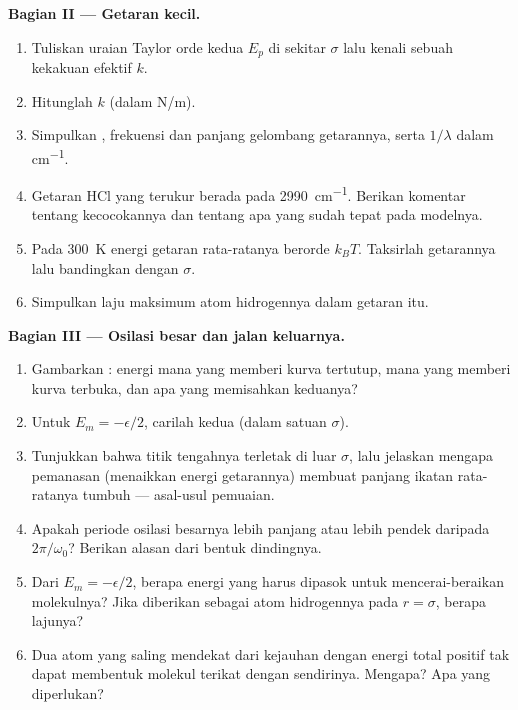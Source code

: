 \begin{problem}
\medskip
\noindent\textbf{Bagian II --- Getaran kecil.}
\begin{enumerate}[resume]
  \item Tuliskan uraian Taylor orde kedua $E_p$ di sekitar $\sigma$ lalu
        kenali sebuah kekakuan efektif $k$.
  \item Hitunglah $k$ (dalam \unit{N/m}).
  \item Simpulkan , frekuensi dan panjang gelombang
        getarannya, serta  $1/\lambda$ dalam \unit{cm^{-1}}.
  \item Getaran HCl yang terukur berada pada \qty{2990}{cm^{-1}}. Berikan
        komentar tentang kecocokannya dan tentang apa yang sudah tepat
        pada modelnya.
  \item Pada \qty{300}{K} energi getaran rata-ratanya berorde $k_BT$.
        Taksirlah  getarannya lalu bandingkan dengan $\sigma$.
  \item Simpulkan laju maksimum atom hidrogennya dalam getaran itu.
\end{enumerate}

\medskip
\noindent\textbf{Bagian III --- Osilasi besar dan jalan keluarnya.}
\begin{enumerate}[resume]
  \item Gambarkan : energi mana yang memberi kurva
        tertutup, mana yang memberi kurva terbuka, dan apa yang
        memisahkan keduanya?
  \item Untuk $E_m = -\epsilon/2$, carilah kedua  (dalam
        satuan $\sigma$).
  \item Tunjukkan bahwa titik tengahnya terletak di luar $\sigma$, lalu
        jelaskan mengapa pemanasan (menaikkan energi getarannya) membuat
        panjang ikatan rata-ratanya tumbuh --- asal-usul pemuaian.
  \item Apakah periode osilasi besarnya lebih panjang atau lebih pendek
        daripada $2\pi/\omega_0$? Berikan alasan dari bentuk dindingnya.
  \item Dari $E_m = -\epsilon/2$, berapa energi yang harus dipasok untuk
        mencerai-beraikan molekulnya? Jika diberikan sebagai  atom hidrogennya pada $r = \sigma$, berapa lajunya?
  \item Dua atom yang saling mendekat dari kejauhan dengan energi total
        positif tak dapat membentuk molekul terikat dengan sendirinya.
        Mengapa? Apa yang diperlukan?
\end{enumerate}


\end{problem}
